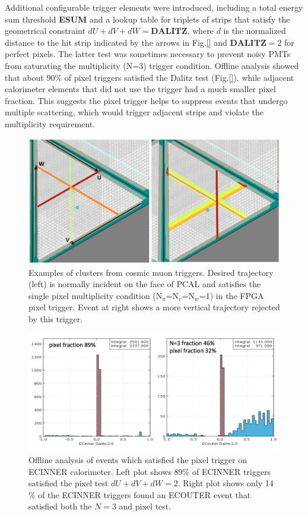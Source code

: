 Additional configurable trigger elements were introduced, including a total energy sum threshold \textbf{ESUM} and a lookup table for triplets of strips that satisfy the geometrical constraint $dU+dV+dW=\textbf{DALITZ}$, where $d$ is the normalized distance to the hit strip indicated by the arrows in Fig.\ref{} and $\textbf{DALITZ}=2$ for perfect pixels.  The latter test was sometimes necessary to prevent noisy PMTs from saturating the multiplicity (N=3) trigger condition.  Offline analysis showed that about $90\%$ of pixel triggers satisfied the Dalitz test (Fig.\ref{}), while adjacent calorimeter elements that did not use the trigger had a much smaller pixel fraction.  This suggests the pixel trigger helps to suppress events that undergo multiple scattering, which would trigger adjacent strips and violate the multiplicity requirement.

\begin{figure}[!htb]
 \centering
  \includegraphics[width=0.95\columnwidth,keepaspectratio]{img/TwoClusters.png}
 \caption{Examples of clusters from cosmic muon triggers.  Desired trajectory (left) is normally incident on the face of PCAL and satisfies the single pixel multiplicity condition (N$_u$=N$_v$=N$_w$=1) in the FPGA pixel trigger.  Event at right shows a more vertical trajectory rejected by this trigger.}
\end{figure}

\begin{figure}[!htb]
 \centering
  \includegraphics[width=1.0\columnwidth,keepaspectratio]{img/PixelFraction.png}
 \caption{Offline analysis of events which satisfied the pixel trigger on ECINNER calorimeter.  Left plot shows 89$\%$ of ECINNER triggers satisfied the pixel test $dU+dV+dW=2$.  Right plot shows only 14$\%$ of the ECINNER triggers found an ECOUTER event that satisfied both the $N=3$ and pixel test.}
\end{figure}


